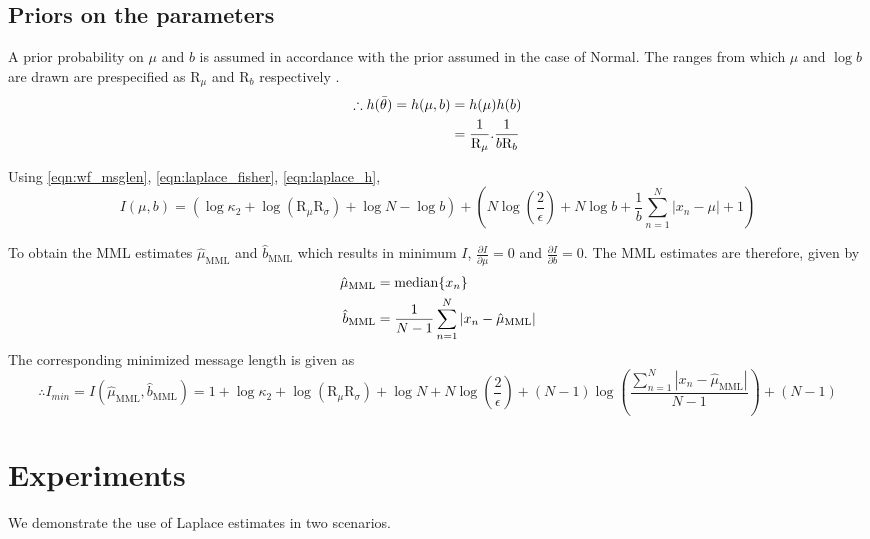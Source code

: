 \documentclass[wcp]{jmlr}
\begin{document}
\subsection*{Priors on the parameters}
A prior probability on $\mu$ and $b$ is assumed in accordance with the prior assumed
in the case of Normal. The ranges from which $\mu$ and $\log b$ are drawn are prespecified as 
$\mathrm{R}_{\mu}$ and $\mathrm{R}_{b}$ respectively \citep{WallaceBook}. 
\begin{align} 
\therefore h(\bar{\theta}) = h(\mu,b) &= h(\mu) h(b) \notag\\
      &= \frac{1}{\mathrm{R}_{\mu}}. \frac{1}{b \mathrm{R}_{b}} \label{eqn:laplace_h} 
\end{align}

Using \eqref{eqn:wf_msglen}, \eqref{eqn:laplace_fisher}, \eqref{eqn:laplace_h},
\begin{dmath*}
 I(\mu,b) = \left( \log\kappa_2 + \log(\mathrm{R}_{\mu}\mathrm{R}_{\sigma}) + \log N - \log b \right) + \left( N\log\left(\frac{2}{\epsilon}\right) + N\log b + \frac{1}{b}\sum_{n=1}^N |x_n-\mu| + 1 \right)
\end{dmath*} 

\noindent To obtain the MML estimates $\hat{\mu}_{\mathrm{MML}}$ and $\hat{b}_{\mathrm{MML}}$ 
which results in minimum $I$, $\frac{\partial I}{\partial \mu} = 0$ and 
$\frac{\partial I}{\partial b} = 0$. The MML estimates are therefore, given by
\begin{align}
  \hat{\mu}_{\mathrm{MML}} &= \mathrm{median}\{x_n\} \notag\\
  \hat{b}_{\mathrm{MML}} &= \frac{1}{N-1} \sum_{n=1}^N |x_n-\hat{\mu}_{\mathrm{MML}}| 
  \label{eqn:laplace_estimate}
\end{align}
The corresponding minimized message length is given as
\begin{dmath}
 \therefore I_{min} = I(\hat{\mu}_{\mathrm{MML}},\hat{b}_{\mathrm{MML}}) = 1 + \log\kappa_2 + \log(\mathrm{R}_{\mu}\mathrm{R}_{\sigma}) + \log N + N\log\left(\frac{2}{\epsilon}\right) + (N-1) \log \left( \frac{\sum_{n=1}^N |x_n-\hat{\mu}_{\mathrm{MML}}|}{N-1} \right) + (N-1) \label{eqn:laplace_mml_estimate}
\end{dmath} 

\section{Experiments}
We demonstrate the use of Laplace estimates in two scenarios. 
\end{document}

